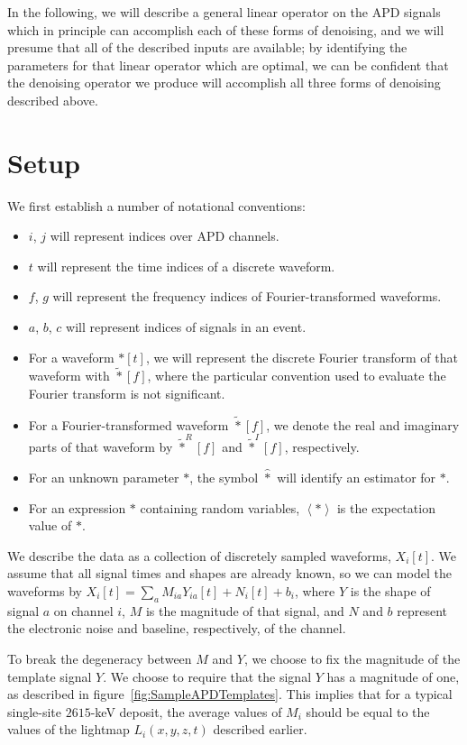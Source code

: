 In the following, we will describe a general linear operator on the APD signals which in principle can accomplish each of these forms of denoising, and we will presume that all of the described inputs are available; by identifying the parameters for that linear operator which are optimal, we can be confident that the denoising operator we produce will accomplish all three forms of denoising described above.

\section{Setup}

We first establish a number of notational conventions:
\begin{itemize}
\item $i$, $j$ will represent indices over APD channels.
\item $t$ will represent the time indices of a discrete waveform.
\item $f$, $g$ will represent the frequency indices of Fourier-transformed waveforms.
\item $a$, $b$, $c$ will represent indices of signals in an event.
\item For a waveform $*[t]$, we will represent the discrete Fourier transform of that waveform with $\widetilde{*}[f]$, where the particular convention used to evaluate the Fourier transform is not significant.
\item For a Fourier-transformed waveform $\widetilde{*}[f]$, we denote the real and imaginary parts of that waveform by $\widetilde{*}^R[f]$ and $\widetilde{*}^I[f]$, respectively.
\item For an unknown parameter $*$, the symbol $\widehat{*}$ will identify an estimator for $*$.
\item For an expression $*$ containing random variables, $\left<*\right>$ is the expectation value of $*$.
\end{itemize}

We describe the data as a collection of discretely sampled waveforms, $X_i[t]$.  We assume that all signal times and shapes are already known, so we can model the waveforms by $X_i[t] = \sum_a M_{ia}Y_{ia}[t] + N_i[t] + b_i$, where $Y$ is the shape of signal $a$ on channel $i$, $M$ is the magnitude of that signal, and $N$ and $b$ represent the electronic noise and baseline, respectively, of the channel.

To break the degeneracy between $M$ and $Y$, we choose to fix the magnitude of the template signal $Y$.  We choose to require that the signal $Y$ has a magnitude of one, as described in figure~\ref{fig:SampleAPDTemplates}.  This implies that for a typical single-site $2615$-keV deposit, the average values of $M_i$ should be equal to the values of the lightmap $L_i(x,y,z,t)$ described earlier.

